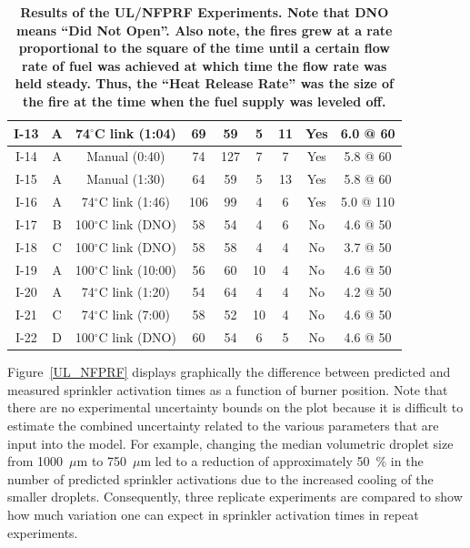 \begin{table}[h!]
\begin{center}
\begin{tabular}{|c||c|c|c|c|c|c|c|c|}
I-13  & A  & 74$^\circ$C link (1:04)    & 69   & 59                             & 5    & 11     & Yes  & 6.0 @ 60  \\ \hline
I-14  & A  & Manual (0:40)              & 74   & 127                            & 7    & 7      & Yes  & 5.8 @ 60  \\ \hline
I-15  & A  & Manual (1:30)              & 64   & 59                             & 5    & 13     & Yes  & 5.8 @ 60  \\ \hline
I-16  & A  & 74$^\circ$C link (1:46)    & 106  & 99                             & 4    & 6      & Yes  & 5.0 @ 110 \\ \hline \hline
I-17  & B  & 100$^\circ$C link (DNO)    & 58   & 54                             & 4    & 6      & No   & 4.6 @ 50 \\ \hline
I-18  & C  & 100$^\circ$C link (DNO)    & 58   & 58                             & 4    & 4      & No   & 3.7 @ 50 \\ \hline
I-19  & A  & 100$^\circ$C link (10:00)  & 56   & 60                             & 10   & 4      & No   & 4.6 @ 50 \\ \hline
I-20  & A  & 74$^\circ$C link (1:20)    & 54   & 64                             & 4    & 4      & No   & 4.2 @ 50 \\ \hline
I-21  & C  & 74$^\circ$C link (7:00)    & 58   & 52                             & 10   & 4      & No   & 4.6 @ 50 \\ \hline
I-22  & D  & 100$^\circ$C link (DNO)    & 60   & 54                             & 6    & 5      & No   & 4.6 @ 50 \\ \hline
\end{tabular}
\end{center}
\caption[Results of the UL/NFPRF Experiments.]
{\bf Results of the UL/NFPRF Experiments. Note that DNO means
``Did Not Open''. Also note, the fires grew at a rate proportional
to the square of the time until a certain flow rate of fuel was achieved
at which time the flow rate was held steady. Thus, the ``Heat Release Rate''
was the size of the fire at the time when the fuel supply was leveled off.}
\label{ULmatrix}
\end{table}

Figure~\ref{UL_NFPRF} displays graphically the difference between predicted and measured sprinkler activation times as a function of 
burner position. Note that there are no experimental uncertainty bounds on the plot because it is difficult to estimate the 
combined uncertainty related to the various parameters that are input into the model. For example, changing the median volumetric droplet 
size from 1000~$\mu$m to 750~$\mu$m led to a reduction of approximately 50~\% in the number of predicted sprinkler activations due to the
increased cooling of the smaller droplets. Consequently, three replicate experiments are compared to show how much variation one can expect in
sprinkler activation times in repeat experiments.

